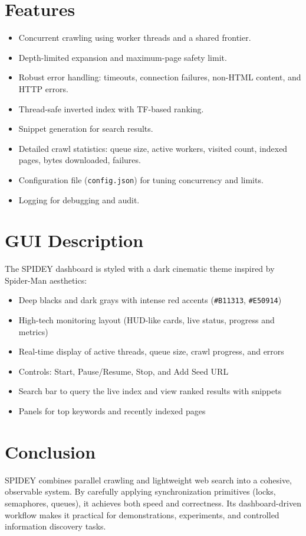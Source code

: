 \documentclass[11pt,a4paper]{article}
\begin{document}
\section{Features}
\begin{itemize}
  \item Concurrent crawling using worker threads and a shared frontier.
  \item Depth-limited expansion and maximum-page safety limit.
  \item Robust error handling: timeouts, connection failures, non-HTML content, and HTTP errors.
  \item Thread-safe inverted index with TF-based ranking.
  \item Snippet generation for search results.
  \item Detailed crawl statistics: queue size, active workers, visited count, indexed pages, bytes downloaded, failures.
  \item Configuration file (\texttt{config.json}) for tuning concurrency and limits.
  \item Logging for debugging and audit.
\end{itemize}

\section{GUI Description}
The SPIDEY dashboard is styled with a dark cinematic theme inspired by Spider-Man aesthetics:
\begin{itemize}
  \item Deep blacks and dark grays with intense red accents (\texttt{\#B11313}, \texttt{\#E50914})
  \item High-tech monitoring layout (HUD-like cards, live status, progress and metrics)
  \item Real-time display of active threads, queue size, crawl progress, and errors
  \item Controls: Start, Pause/Resume, Stop, and Add Seed URL
  \item Search bar to query the live index and view ranked results with snippets
  \item Panels for top keywords and recently indexed pages
\end{itemize}

\section{Conclusion}
SPIDEY combines parallel crawling and lightweight web search into a cohesive, observable system. By carefully applying synchronization primitives (locks, semaphores, queues), it achieves both speed and correctness. Its dashboard-driven workflow makes it practical for demonstrations, experiments, and controlled information discovery tasks.
\end{document}
